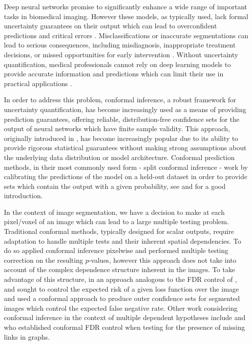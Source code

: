 


Deep neural networks promise to significantly enhance a wide range of important tasks in biomedical imaging. However these models, as typically used, lack formal uncertainty guarantees on their output which can lead to overconfident predictions and critical errors \citep{Guo2017, Gupta2020}. Misclassifications or inaccurate segmentations can lead to serious consequences, including misdiagnosis, inappropriate treatment decisions, or missed opportunities for early intervention \citep{Topol2019}. Without uncertainty quantification, medical professionals cannot rely on deep learning models to provide accurate information and predictions which can limit their use in practical applications \citep{Jungo2020}. 

In order to address this problem, conformal inference, a robust framework for uncertainty quantification, has become increasingly used as a means of providing prediction guarantees, offering reliable, distribution-free confidence sets for the output of neural networks which have finite sample validity. This approach, originally introduced in \cite{Papadopoulos2002, Vovk2005}, has become increasingly popular due to its ability to provide rigorous statistical guarantees without making strong assumptions about the underlying data distribution or model architecture. Conformal prediction methods, in their most commonly used form - split conformal inference - work by calibrating the predictions of the model on a held-out dataset in order to provide sets which contain the output with a given probability, see \cite{Shafer2008} and \cite{Angelopoulos2021} for a good introduction.

In the context of image segmentation, we have a decision to make at each pixel/voxel of an image which can lead to a large multiple testing problem. Traditional conformal methods, typically designed for scalar outputs, require adaptation to handle multiple tests and their inherent spatial dependencies. To do so \cite{Angelopoulos2021LTT} applied conformal inference pixelwise and performed multiple testing correction on the resulting $p$-values, however this approach does not take into account of the complex dependence structure inherent in the images. To take advantage of this structure, in an approach analogous to the FDR control of \citep{Benjamini1995}, \cite{Bates2021} and \cite{Angelopoulos2022} sought to control the expected risk of a given loss function over the image and used a conformal approach to produce outer confidence sets for segmented images which control the expected false negative rate. Other work considering conformal inference in the context of multiple dependent hypotheses include \cite{Marandon2024} and \cite{Blanchard2024} who established conformal FDR control when testing for the presence of missing links in graphs.

